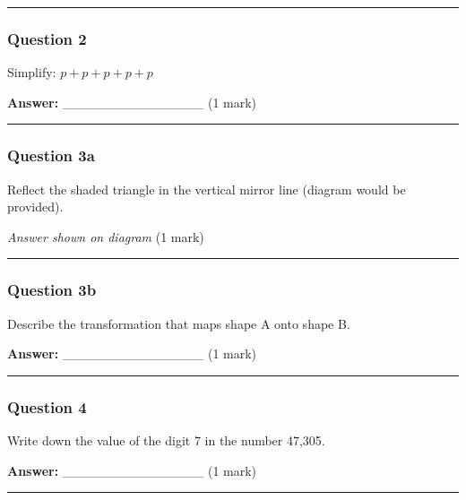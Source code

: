 \begin{center}\rule{0.5\linewidth}{0.5pt}\end{center}

\subsubsection{Question 2}\label{question-2}

Simplify: \(p + p + p + p + p\)

\textbf{Answer:} \_\_\_\_\_\_\_\_\_\_\_\_\_\_\_ (1 mark)

\begin{center}\rule{0.5\linewidth}{0.5pt}\end{center}

\subsubsection{Question 3a}\label{question-3a}

Reflect the shaded triangle in the vertical mirror line (diagram would
be provided).

\emph{Answer shown on diagram} (1 mark)

\begin{center}\rule{0.5\linewidth}{0.5pt}\end{center}

\subsubsection{Question 3b}\label{question-3b}

Describe the transformation that maps shape A onto shape B.

\textbf{Answer:} \_\_\_\_\_\_\_\_\_\_\_\_\_\_\_ (1 mark)

\begin{center}\rule{0.5\linewidth}{0.5pt}\end{center}

\subsubsection{Question 4}\label{question-4}

Write down the value of the digit 7 in the number 47,305.

\textbf{Answer:} \_\_\_\_\_\_\_\_\_\_\_\_\_\_\_ (1 mark)

\begin{center}\rule{0.5\linewidth}{0.5pt}\end{center}

